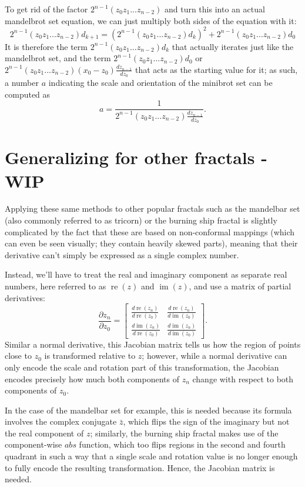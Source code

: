 \documentclass[12pt,a4paper]{article}
\newcommand{\mat}[1]{\begin{bmatrix} #1 \end{bmatrix}}
\DeclareMathOperator{\re}{re}
\DeclareMathOperator{\im}{im}
\begin{document}
To get rid of the factor $2^{n-1}(z_0z_1...z_{n-2})$ and turn this into an actual mandelbrot set equation, we can just multiply both sides of the equation with it:
$$2^{n-1}(z_0z_1...z_{n-2})d_{k+1}=(2^{n-1}(z_0z_1...z_{n-2})d_k)^2+2^{n-1}(z_0z_1...z_{n-2})d_0$$
It is therefore the term $2^{n-1}(z_0z_1...z_{n-2})d_k$ that actually iterates just like the mandelbrot set, and the term $2^{n-1}(z_0z_1...z_{n-2})d_0$ or $2^{n-1}(z_0z_1...z_{n-2})(x_0-z_0)\frac{dz_{n-1}}{dz_0}$ that acts as the starting value for it; as such, a number $a$ indicating the scale and orientation of the minibrot set can be computed as $$a=\frac{1}{2^{n-1}(z_0z_1...z_{n-2})\frac{dz_{n-1}}{dz_0}}.$$

\section{Generalizing for other fractals - WIP}

Applying these same methods to other popular fractals such as the mandelbar set (also commonly referred to as tricorn) or the burning ship fractal is slightly complicated by the fact that these are based on non-conformal mappings (which can even be seen visually; they contain heavily skewed parts), meaning that their derivative can't simply be expressed as a single complex number.

Instead, we'll have to treat the real and imaginary component as separate real numbers, here referred to as $\re(z)$ and $\im(z)$, and use a matrix of partial derivatives:
$$\frac{\partial z_n}{\partial z_0} = \mat{\frac{d\re(z_n)}{d\re(z_0)}&\frac{d\re(z_n)}{d\im(z_0)}\\\frac{d\im(z_n)}{d\re(z_0)}&\frac{d\im(z_n)}{d\im(z_0)}}.$$
Similar a normal derivative, this Jacobian matrix tells us how the region of points close to $z_0$ is transformed relative to $z$; however, while a normal derivative can only encode the scale and rotation part of this transformation, the Jacobian encodes precisely how much both components of $z_n$ change with respect to both components of $z_0$.

In the case of the mandelbar set for example, this is needed because its formula involves the complex conjugate $\bar{z}$, which flips the sign of the imaginary but not the real component of $z$; similarly, the burning ship fractal makes use of the component-wise $abs$ function, which too flips regions in the second and fourth quadrant in such a way that a single scale and rotation value is no longer enough to fully encode the resulting transformation. Hence, the Jacobian matrix is needed.
\end{document}
